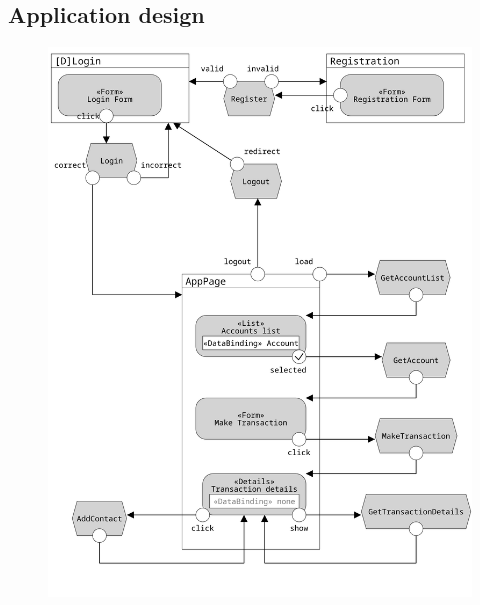 \documentclass{article}
\begin{document}
\subsection{Application design}
\begin{figure}[H]
	\centering
	\includegraphics[width=1\textwidth]{assets/ifml_ria.png}
\end{figure}
\pagebreak
\end{document}
